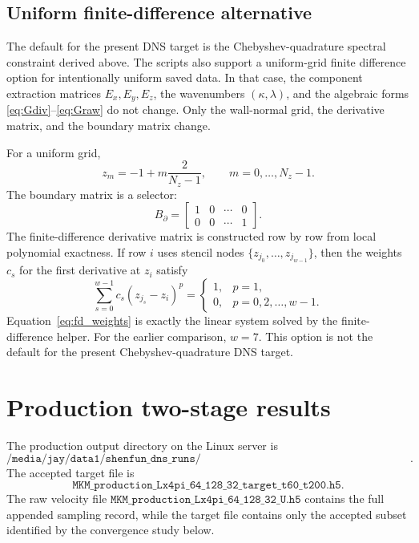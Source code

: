 \documentclass[11pt]{article}
\newcommand{\Ez}{E_z}
\newcommand{\Ex}{E_x}
\newcommand{\Ey}{E_y}
\newcommand{\Bbdry}{B_{\partial}}
\begin{document}
\subsection{Uniform finite-difference alternative}

The default for the present DNS target is the Chebyshev-quadrature spectral
constraint derived above. The scripts also support a uniform-grid finite
difference option for intentionally uniform saved data. In that case, the
component extraction matrices \(\Ex,\Ey,\Ez\), the wavenumbers
\((\kappa,\lambda)\), and the algebraic forms
\eqref{eq:Gdiv}--\eqref{eq:Graw} do not change. Only the wall-normal grid, the
derivative matrix, and the boundary matrix change.

For a uniform grid,
\[
  z_m = -1 + m\frac{2}{N_z-1},\qquad m=0,\ldots,N_z-1.
\]
The boundary matrix is a selector:
\[
  \Bbdry =
  \begin{bmatrix}
    1 & 0 & \cdots & 0\\
    0 & 0 & \cdots & 1
  \end{bmatrix}.
\]
The finite-difference derivative matrix is constructed row by row from local
polynomial exactness. If row \(i\) uses stencil nodes
\(\{z_{j_0},\ldots,z_{j_{w-1}}\}\), then the weights \(c_s\) for the first
derivative at \(z_i\) satisfy
\begin{equation}
  \sum_{s=0}^{w-1} c_s(z_{j_s}-z_i)^p
  =
  \begin{cases}
    1, & p=1,\\
    0, & p=0,2,\ldots,w-1.
  \end{cases}
  \label{eq:fd_weights}
\end{equation}
Equation~\eqref{eq:fd_weights} is exactly the linear system solved by the
finite-difference helper. For the earlier comparison, \(w=7\). This option is
not the default for the present Chebyshev-quadrature DNS target.

\section{Production two-stage results}
\label{sec:production_results}

The production output directory on the Linux server is
\[
  \texttt{/media/jay/data1/shenfun\_dns\_runs/production\_mkm\_Lx4pi\_64\_128\_32\_20260713}.
\]
The accepted target file is
\[
  \texttt{MKM\_production\_Lx4pi\_64\_128\_32\_target\_t60\_t200.h5}.
\]
The raw velocity file
\(\texttt{MKM\_production\_Lx4pi\_64\_128\_32\_U.h5}\) contains the full
appended sampling record, while the target file contains only the accepted
subset identified by the convergence study below.
\end{document}
